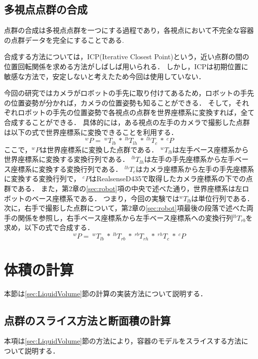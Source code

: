	\subsection{多視点点群の合成}
	点群の合成は多視点点群を一つにする過程であり，各視点において不完全な容器の点群データを完全にすることである.
	
	合成する方法については，ICP(Iterative Closest Point)という，近い点群の間の位置回転関係を求める方法がしばしば用いられる．%
	しかし，ICPは初期位置に敏感な方法で，安定しないと考えたため今回は使用していない．
	
	今回の研究ではカメラがロボットの手先に取り付けてあるため，ロボットの手先の位置姿勢が分かれば，カメラの位置姿勢も知ることができる．
	そして，それぞれロボットの手先の位置姿勢で各視点の点群を世界座標系に変換すれば，全て合成することができる．
	具体的には，ある視点の左手のカメラで撮影した点群は以下の式で世界座標系に変換できることを利用する．
	\begin{equation}
		^wP =\:^wT_{lb}\:*\:^{lb}T_{lh}\:*\:^{lh}T_c\:*\:^cP
	\end{equation}
	ここで，$^wP$は世界座標系に変換した点群である．
	$^wT_{lb}$は左手ベース座標系から世界座標系に変換する変換行列である．
	$^{lb}T_{lh}$は左手の手先座標系から左手ベース座標系に変換する変換行列である．
	$^{lh}T_c$はカメラ座標系から左手の手先座標系に変換する変換行列で，
	$^cP$はRealsenseD435で取得したカメラ座標系の下での点群である．
	また，第2章の\ref{sec:robot}項の中央で述べた通り，世界座標系は左ロボットのベース座標系である．
	つまり，今回の実験では$^wT_{lb}$は単位行列である．
	次に，右手で撮影した点群について，第2章の\ref{sec:robot}項最後の段落で述べた両手の関係を参照し，右手ベース座標系から左手ベース座標系への変換行列$^{lb}T_{rb}$を求め，以下の式で合成する．
	\begin{equation}
	^wP =\:^wT_{lb}\:*\:^{lb}T_{rb}\:*\:^{rb}T_{rh}\:*\:^{rh}T_c\:*\:^cP
	\end{equation}
	
\section{体積の計算}
本節は\ref{sec:LiquidVolume}節の計算の実装方法について説明する．
	
	\subsection{点群のスライス方法と断面積の計算}\label{sec:slice}
	本項は\ref{sec:LiquidVolume}節の方法により，容器のモデルをスライスする方法について説明する．
	
